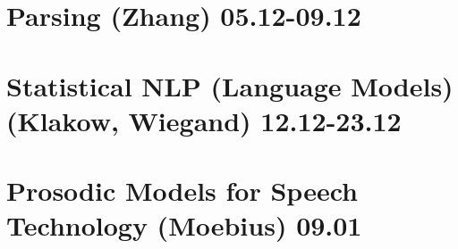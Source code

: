 \documentclass[11pt]{article}
\begin{document}
\section{Parsing (Zhang) 05.12-09.12}

\section{Statistical NLP (Language Models) (Klakow, Wiegand) 12.12-23.12}

\section{Prosodic Models for Speech Technology (Moebius) 09.01}

%
%
%
%
%
%
%
%
%
%
%
%
%
%
%
%
%
%
%
%
%
%
%
%
%
%
\end{document}
